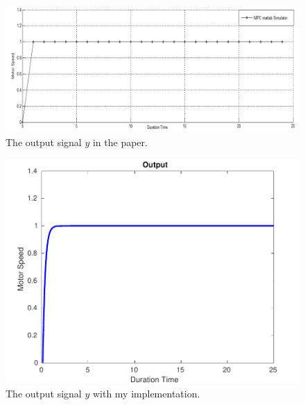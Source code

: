 \documentclass{article}
\begin{document}
\begin{minipage}{\textwidth}
    \begin{minipage}{0.6\textwidth}
        \begin{figure}[H]
            \centering
            \includegraphics[width=\textwidth]{src/ori_output.png}
            \caption{The output signal $y$ in the paper.}
            \label{fig:ori-output}
        \end{figure}
    \end{minipage}
    \begin{minipage}{0.4\textwidth}
        \begin{figure}[H]
            \centering
            \includegraphics[width=\textwidth]{src/output.pdf}
            \caption{The output signal $y$ with my implementation.}
            \label{fig:output}
        \end{figure}
    \end{minipage}

\end{minipage}
\end{document}
